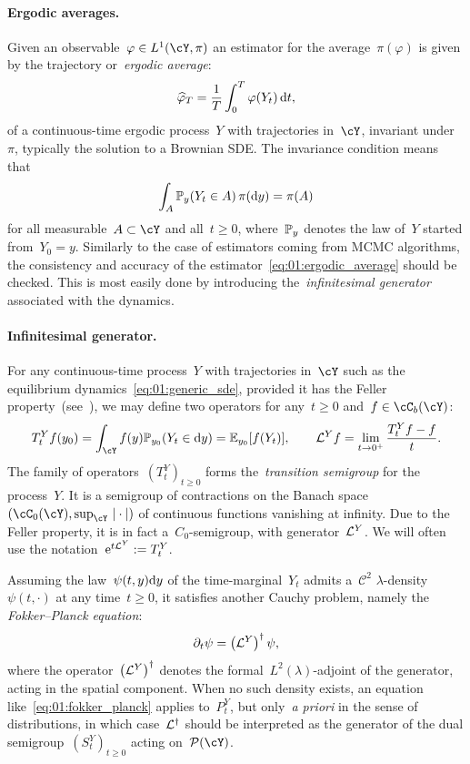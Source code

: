 \paragraph{Ergodic averages.}
Given an observable~$\varphi\in L^1(\cY,\pi)$ an estimator for the average~$\pi(\varphi)$ is given by the trajectory or~\textit{ergodic average}:
\begin{equation}
    \label{eq:01:ergodic_average}
    \widehat\varphi_T = \frac1T\int_0^T \varphi(Y_t)\,\d t,
\end{equation}
of a continuous-time ergodic process~$Y$ with trajectories in~$\cY$, invariant under~$\pi$, typically the solution to a Brownian SDE.
The invariance condition means that
\begin{equation}
    \label{eq:invariance}
    \int_{A} \P_y(Y_t\in A)\,\pi(\d y) = \pi(A)
\end{equation}
for all measurable~$A\subset \cY$ and all~$t\geq 0$, where~$\P_y$ denotes the law of~$Y$ started from~$Y_0=y$.
Similarly to the case of estimators coming from MCMC algorithms, the consistency and accuracy of the estimator~\eqref{eq:01:ergodic_average} should be checked. This is most easily done by introducing the~\textit{infinitesimal generator} associated with the dynamics.

\paragraph{Infinitesimal generator.}
For any continuous-time process~$Y$ with trajectories in~$\cY$ such as the equilibrium dynamics~\eqref{eq:01:generic_sde}, provided it has the Feller property~(see~\cite[Section III.2]{RY13}), we may define two operators for any~$t\geq 0$ and~$f\in\cC_b(\cY)$:
\begin{equation}
    \label{eq:01:feller_process}
    T_t^Y f(y_0) = \int_{\cY}f(y)\P_{y_0}(Y_t\in\d y) = \E_{y_0}[f(Y_t)],\qquad \cL^Y f = \underset{t\to 0^+}{\lim}\, \frac{T_t^Y f-f}{t}.
\end{equation}
The family of operators~$(T_t^Y)_{t\geq 0}$ forms the~\textit{transition semigroup} for the process~$Y$. It is a semigroup of contractions on the Banach space~$(\cC_0(\cY),\sup_{\cY}\,|\cdot|)$ of continuous functions vanishing at infinity. Due to the Feller property, it is in fact a~$C_0$-semigroup, with generator~$\cL^Y$. We will often use the notation~$\e^{t\cL^Y}:=T_t^Y$.

Assuming the law~$\psi(t,y)\d y$ of the time-marginal~$Y_t$ admits a~$\mathcal C^2$ $\lambda$-density~$\psi(t,\cdot)$ at any time~$t\geq 0$, it satisfies another Cauchy problem, namely the \textit{Fokker--Planck equation}:
\begin{equation}
    \label{eq:01:fokker_planck}
    \partial_t \psi = \left(\cL^{Y}\right)^\dagger\psi,
\end{equation}
where the operator~$\left(\cL^{Y}\right)^\dagger$ denotes the formal~$L^2(\lambda)$-adjoint of the generator, acting in the spatial component. When no such density exists, an equation like~\eqref{eq:01:fokker_planck} applies to~$P^Y_t$, but only~\textit{a priori} in the sense of distributions, in which case~$\cL^\dagger$ should be interpreted as the generator of the dual semigroup~$(S_t^Y)_{t\geq 0}$ acting on~$\mathcal P(\cY)$.

